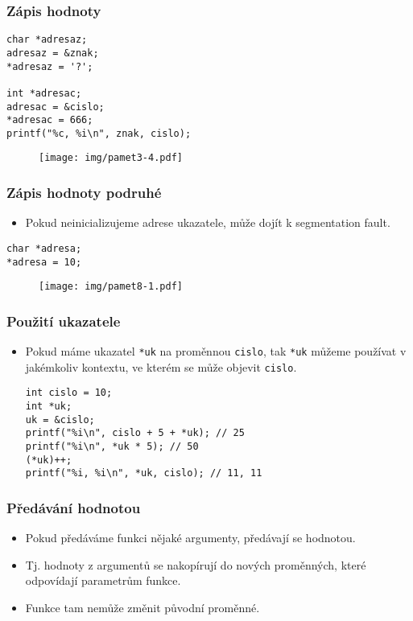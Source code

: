 \documentclass{beamer}
\newenvironment{itemizey}%
  {\large \begin{itemize}%
    \setlength{\itemsep}{6pt}%
    \setlength{\parskip}{6pt}}%
  {\end{itemize}}
\newenvironment{itemizex}%
  {\large \begin{itemize}%
    \setlength{\itemsep}{8pt}%
    \setlength{\parskip}{8pt}}%
  {\end{itemize}}
\begin{document}
\begin{frame}[t,fragile]\frametitle{Zápis hodnoty} 
\begin{verbatim} 
char *adresaz; 
adresaz = &znak;
*adresaz = '?';

int *adresac; 
adresac = &cislo;
*adresac = 666;
printf("%c, %i\n", znak, cislo);
\end{verbatim}

\begin{figure}[htb]
    \centering
    \texttt{[image: img/pamet3-4.pdf]}
\end{figure}
\end{frame}



\begin{frame}[t,fragile]\frametitle{Zápis hodnoty podruhé} 
\begin{itemizex}
    \item Pokud neinicializujeme adrese ukazatele, může dojít k segmentation fault.
\end{itemizex}
\begin{verbatim} 
char *adresa;
*adresa = 10;
\end{verbatim}

\begin{figure}[htb]
    \centering
    \texttt{[image: img/pamet8-1.pdf]}
\end{figure}
\end{frame}


\begin{frame}[t,fragile]\frametitle{Použití ukazatele} 
\begin{itemizex}
    \item Pokud máme ukazatel \texttt{*uk} na proměnnou \texttt{cislo}, tak \texttt{*uk} můžeme používat v jakémkoliv kontextu, ve kterém se může objevit \texttt{cislo}.
\begin{verbatim} 
int cislo = 10;
int *uk; 
uk = &cislo;
printf("%i\n", cislo + 5 + *uk); // 25
printf("%i\n", *uk * 5); // 50
(*uk)++;
printf("%i, %i\n", *uk, cislo); // 11, 11
\end{verbatim}
\end{itemizex}
\end{frame}


\begin{frame}[t,fragile]\frametitle{Předávání hodnotou} 
    \begin{itemizey}
        \item Pokud předáváme funkci nějaké argumenty, předávají se hodnotou.
        \item Tj. hodnoty z argumentů se nakopírují do nových proměnných, které odpovídají parametrům funkce.
        \item Funkce tam nemůže změnit původní proměnné. 
    \end{itemizey}
\end{frame}
\end{document}
